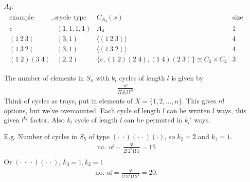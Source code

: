 \emph{$A_4$}:
\begin{align*}
    \begin{array}{cccc}
        \text{example member}, x & \text{cycle type} & C_{A_4}(x) & \text{size of ccl} \\
        e & (1, 1, 1, 1) & A_4 & 1 \\
        (1\ 2\ 3) & (3, 1) & \langle (1\ 2\ 3) \rangle & 4\\
        (1\ 3\ 2) & (3, 1) & \langle (1\ 3\ 2) \rangle & 4 \\
        (1\; 2)(3\; 4) & (2, 2) & \{e, (1\; 2)(2\; 4), (1\; 4)(2\; 3) \} \cong C_2 \times C_2 & 3
    \end{array}  
\end{align*} 

\begin{remark}
    The number of elements in $S_n$ with $k_l$ cycles of length $l$ is given by 
    \begin{align*}
        \frac{n!}{\Pi_l k_l! \, l^{k_l}}.
    \end{align*} 
    Think of cycles as trays, put in elements of $X = \{1, 2, \dots, n\}$.
    This gives $n!$ options, but we've overcounted.
    Each cycle of length $l$ can be written $l$ ways, this given $l^{k_l}$ factor.
    Also $k_l$ cycle of length $l$ can be permuted in $k_l !$ ways.
\end{remark} 

\begin{example}
    E.g. Number of cycles in $S_5$ of type $(\cdot \ \cdot) (\cdot \ \cdot) (\cdot)$, so $k_2 = 2$ and $k_1 = 1$.
    \begin{align*}
        \text{no. of} = \frac{5!}{2! \, 2^2 1! \, 1} = 15 \\ 
    \end{align*} 
    Or $(\cdot \ \cdot \ \cdot) (\cdot \ \cdot)$, $k_3 = 1, k_2 = 1$
    \begin{align*}
        \text{no. of} = \frac{5!}{1! \, 3^1 1! \, 2^1} = 20.
    \end{align*} 
\end{example} 

